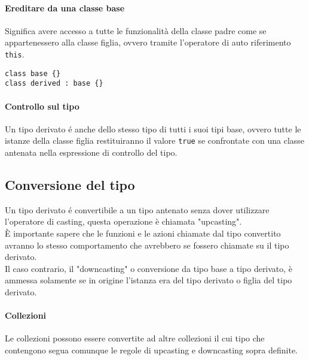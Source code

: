 \paragraph{Ereditare da una classe base} 
Significa avere accesso a tutte le funzionalità della classe padre come se appartenessero alla classe figlia,
ovvero tramite l'operatore di auto riferimento \lstinline|this|.
\begin{lstlisting}
class base {}
class derived : base {}
\end{lstlisting}
\paragraph{Controllo sul tipo}
Un tipo derivato é anche dello stesso tipo di tutti i suoi tipi base, ovvero tutte le istanze
della classe figlia restituiranno il valore \lstinline|true| se confrontate con una classe 
antenata nella espressione di controllo del tipo. 

\subsection{Conversione del tipo}
Un tipo derivato é convertibile a un tipo antenato senza dover utilizzare l'operatore di casting,
questa operazione è chiamata "upcasting". \\
È importante sapere che le funzioni e le azioni chiamate dal tipo convertito avranno 
lo stesso comportamento che avrebbero se fossero chiamate su il tipo derivato. \\
Il caso contrario, il "downcasting" o conversione da tipo base a tipo derivato, è ammessa solamente
se in origine l'istanza era del tipo derivato o figlia del tipo derivato. 

\paragraph{Collezioni}
Le collezioni possono essere convertite ad altre collezioni il cui tipo che contengono segua 
comunque le regole di upcasting e downcasting sopra definite. 

